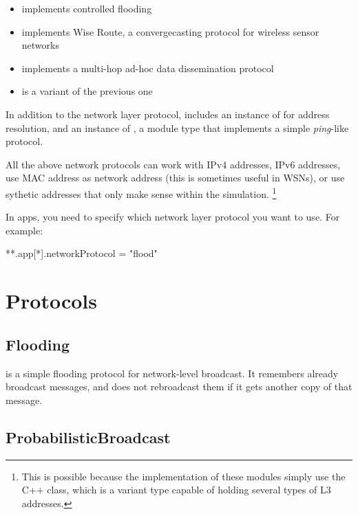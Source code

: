 \begin{itemize}
  \item {} implements controlled flooding
  \item {} implements Wise Route, a convergecasting protocol for wireless sensor networks
  \item {} implements a multi-hop ad-hoc data dissemination protocol
  \item {} is a variant of the previous one
\end{itemize}

In addition to the network layer protocol, 
includes an instance of  for address resolution,
and an instance of , a module type that
implements a simple \textit{ping}-like protocol.

All the above network protocols can work with IPv4 addresses, IPv6 addresses,
use MAC address as network address (this is sometimes useful in WSNs),
or use sythetic addresses that only make sense within the simulation.
\footnote{This is possible because the implementation of these modules
simply use the  C++ class, which is a variant type capable of
holding several types of L3 addresses.}

In apps, you need to specify which network layer protocol you want to use.
For example:

\begin{inifile}
**.app[*].networkProtocol = "flood"
\end{inifile}


\section{Protocols}
\label{sec:networkprotocols:protocols}

\subsection{Flooding}
\label{sec:networkprotocols:flooding}

 is a simple flooding protocol for network-level broadcast.
It remembers already broadcast messages, and does not rebroadcast
them if it gets another copy of that message.

\subsection{ProbabilisticBroadcast}
\label{sec:networkprotocols:probabilisticbroadcast}

